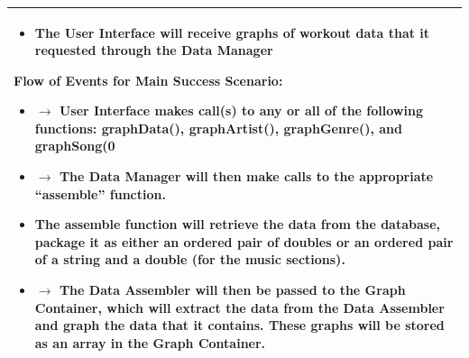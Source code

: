 \documentclass[letterpaper,english, 12pt]{scrreprt}
\begin{document}
\begin{center}
\begin{longtable}{|C{15cm}|}
\begin{itemize}
                                        \item The User Interface will receive graphs of workout data that it requested through the Data Manager
                                \end{itemize}
                        \begin{flushleft}
                                \textbf{Flow of Events for Main Success Scenario: }
                        \end{flushleft}
                                \begin{itemize}
                                        \item $\rightarrow$ User Interface makes call(s) to any or all of the following functions: graphData(), graphArtist(), graphGenre(), and graphSong(0                                        \item $\rightarrow$ The Data Manager will then make calls to the appropriate “assemble” function.
                                        \item The assemble function will retrieve the data from the database, package it as either an ordered pair of doubles or an ordered pair of a string and a double (for the music sections).
                                        \item $\rightarrow$ The Data Assembler will then be passed to the Graph Container, which will extract the data from the Data Assembler and graph the data that it contains. These graphs will be stored as an array in the Graph Container.
                                \end{itemize}
                       \\
                \hline
        \end{longtable}
\end{center}
\end{document}
